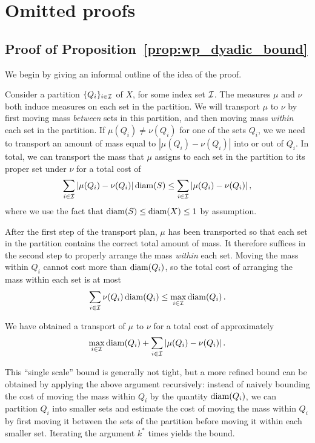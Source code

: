 \section{Omitted proofs}\label{appendix:omitted}
\subsection{Proof of Proposition~\ref{prop:wp_dyadic_bound}}
We begin by giving an informal outline of the idea of the proof.

Consider a partition $\{Q_i\}_{i \in \mathcal{I}}$ of $X$, for some index set $\mathcal{I}$.
The measures $\mu$ and $\nu$ both induce measures on each set in the partition.
We will transport $\mu$ to $\nu$ by first moving mass \emph{between} sets in this partition, and then moving mass \emph{within} each set in the partition.
If $\mu(Q_i) \neq \nu(Q_i)$ for one of the sets $Q_i$, we we need to transport an amount of mass equal to $|\mu(Q_i) - \nu(Q_i)|$ into or out of $Q_i$.
In total, we can transport the mass that $\mu$ assigns to each set in the partition to its proper set under $\nu$ for a total cost of
\begin{equation*}
\sum_{i \in \mathcal{I}} |\mu(Q_i) - \nu(Q_i)| \operatorname{diam}(S) \leq \sum_{i \in \mathcal{I}} |\mu(Q_i) - \nu(Q_i)|\,,
\end{equation*}
where we use the fact that $\operatorname{diam}(S) \leq \operatorname{diam}(X) \leq 1$ by assumption.

After the first step of the transport plan, $\mu$ has been transported so that each set in the partition contains the correct total amount of mass.
It therefore suffices in the second step to properly arrange the mass \emph{within} each set.
Moving the mass within $Q_i$ cannot cost more than $\operatorname{diam}(Q_i)$, so the total cost of arranging the mass within each set is at most
\begin{equation*}
\sum_{i \in \mathcal{I}} \nu(Q_i) \operatorname{diam}(Q_i) \leq \max_{i \in \mathcal{I}} \operatorname{diam}(Q_i)\,.
\end{equation*}

We have obtained a transport of $\mu$ to $\nu$ for a total cost of approximately
\begin{equation*}
\max_{i \in \mathcal{I}} \operatorname{diam}(Q_i) + \sum_{i \in \mathcal{I}} |\mu(Q_i) - \nu(Q_i)|\,.
\end{equation*}

This ``single scale'' bound is generally not tight, but a more refined bound can be obtained by applying the above argument recursively: instead of naively bounding the cost of moving the mass within $Q_i$ by the quantity $\operatorname{diam}(Q_i)$, we can partition $Q_i$ into smaller sets  and estimate the cost of moving the mass within $Q_i$ by first moving it between the sets of the partition before moving it within each smaller set.
Iterating the argument $k^*$ times yields the bound.

